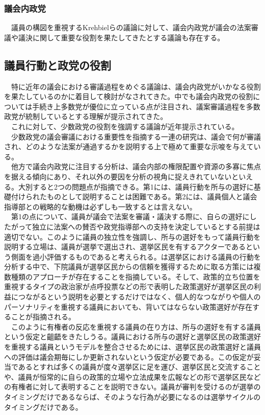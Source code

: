 \subsubsection{議会内政党}
　議員の構図を重視するKrehbielらの議論に対して、議会内政党が議会の法案審議や議決に関して重要な役割を果たしてきたとする議論も存在する。\citep*{Cox2005-pn,Cox2007-xq,Rohde1991-da,Aldrich1995-xf}\\
\subsection{議員行動と政党の役割}
　特に近年の議会における審議過程をめぐる議論は、議会内政党がいかなる役割を果たしているのかに着目して検討がなされてきた。中でも議会内政党の役割については手続き上多数党が優位に立っている点が注目され、議案審議過程を多数政党が統制しているとする理解が提示されてきた。\citep*{Cox2005-pn,Cox2007-xq}\\
　これに対して、少数政党の役割を強調する議論が近年提示されている。\citep*{Hughes2018-dj,Hughes2021-cp,Ballard2021-su}\\
　少数政党の議会審議における重要性を指摘する一連の研究は、議会で何が審議され、どのような法案が通過するかを説明する上で極めて重要な示唆を与えている。\\
　他方で議会内政党に注目する分析は、議会内部の権限配置や資源の多寡に焦点を据える傾向にあり、それ以外の要因を分析の視角に捉えきれていないといえる。大別すると2つの問題点が指摘できる。第1には、議員行動を所与の選好に基礎付けられたものとして説明することは困難である。第2には、議員個人と議会指導部との戦略的な動機は必ずしも一致するとは言えない。\\
　第1の点について、議員が議会で法案を審議・議決する際に、自らの選好にしたがって独立に法案への賛否や政党指導部への支持を決定しているとする前提は適切でない。このように議員の独立性を強調し、所与の選好をもって議員行動を説明する立場は、議員が選挙で選出され、選挙区民を有するアクターであるという側面を過小評価するものであると考えられる。\citet*{Fenno1977-se,Fenno2000-up}は選挙区における議員の行動を分析する中で、下院議員が選挙区民からの信頼を獲得するために取る方策には複数種類のアプローチが存在することを指摘している。そして、政策的立ち位置を重視するタイプの政治家が点呼投票などの形で表明した政策選好が選挙区民の利益につながるという説明を必要とするだけではなく、個人的なつながりや個人のパーソナリティを重視する議員においても、背いてはならない政策選好が存在することが指摘される。\citep*{Fenno2000-up}\\
　このように有権者の反応を重視する議員の在り方は、所与の選好を有する議員という仮定と齟齬をきたしうる。議員における所与の選好と選挙区民の政策選好を重視する議員というモデルを整合させるためには、選挙区民の政策選好と議員への評価は議会期毎にしか更新されないという仮定が必要である。この仮定が妥当であるとすれば多くの議員が度々選挙区に足を運び、選挙区民と交流することや、議員が恒常的に自らの政策的立場や立法成果を広報などの形で選挙区民などの有権者に対して表明することを説明できない。議員が審判を受けるのが選挙のタイミングだけであるならば、そのような行為が必要になるのは選挙サイクルのタイミングだけである。\\
